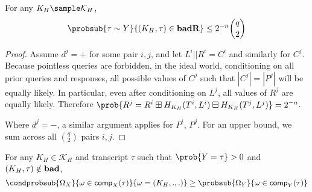 \documentclass[eprint.tex]{subfiles}
\begin{document}
\begin{lemma} \label{badR}
    For any $K_H \sample \mathcal{K}_H$,
    \begin{displaymath}
        \probsub{\tau \sim Y}{(K_H, \tau) \in \badR}
        \leq 2^{-n} \binom{q}{2}
    \end{displaymath}
\end{lemma}

\begin{proof}
    Assume $d^j = +$ for some pair $i, j$, and let $L^i || R^i = C^i$ and similarly for $C^j$.
    Because pointless queries are forbidden, in the ideal world,
    conditioning on all prior queries and responses,
    all possible values of $C^j$ such that $|C^j| = |P^j|$ will be equally likely.
    In particular, even after conditioning on $L^j$,
    all values of $R^j$ are equally likely. Therefore
    $\prob{R^j = R^i \boxplus H_{K_H}(T^i, L^i) \boxminus H_{K_H}(T^j, L^j)} = 2^{-n}$.

    Where $d^j = -$, a similar argument applies for $P^i$, $P^j$.
    For an upper bound, we sum across all $\binom{q}{2}$ pairs $i, j$.
\end{proof}

\begin{lemma} \label{notbad}
    For any $K_H \in \mathcal{K}_H$ and transcript $\tau$ such that $\prob{Y = \tau} > 0$ and
    $(K_H, \tau) \notin \operatorname{\mathbf{bad}}$,
    \begin{displaymath}
        \condprobsub{\Omega_X}{\omega \in \comp_X(\tau)}{\omega = (K_H, ., .)}
        \geq
        \probsub{\Omega_Y}{\omega \in \comp_Y(\tau)}
    \end{displaymath}
\end{lemma}
\end{document}
